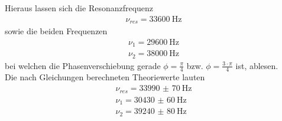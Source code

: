 \noindent Hieraus lassen sich die Resonanzfrequenz
\begin{align*}
  \nu_{res}= \SI{33600}{\hertz}
\end{align*}
sowie die beiden Frequenzen
\begin{align*}
  \nu_1 = \SI{29600}{\hertz} \\
  \nu_2 = \SI{38000}{\hertz}
\end{align*}
bei welchen die Phasenverschiebung gerade $\phi = \frac{\pi}{4}$ bzw. $\phi= \frac{3 \cdot \pi}{4}$
ist, ablesen. \\
\noindent Die nach Gleichungen %
berechneten Theoriewerte lauten
\begin{align*}
  \nu_{res}= \SI{33990(70)}{\hertz} \\
  \nu_1 = \SI{30430(60)}{\hertz} \\
  \nu_2 = \SI{39240(80)}{\hertz}
\end{align*}
